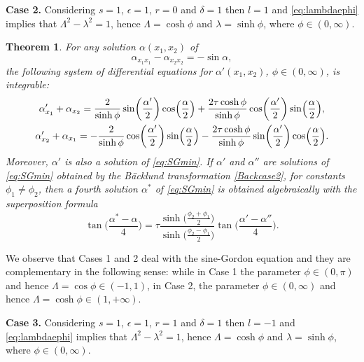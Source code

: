 \documentclass[pdftex]{sigma}
\numberwithin{equation}{section}
\newtheorem{Theorem}{Theorem}[section]
\begin{document}
{\bf Case 2.}
Considering $s=1$, $\epsilon=1$, $r=0$ and $\delta=1$ then $l=1$ and \eqref{eq:lambdaephi} implies that
$\Lambda^2 -\lambda^2=1$, hence $\Lambda=\cosh\phi$ and $\lambda=\sinh\phi$,
where $\phi\in (0,\infty)$.

\begin{Theorem}%
For any solution $\alpha(x_1,x_2)$ of
\begin{equation}\label{eq:SGmin}
\alpha_{x_1x_1}-\alpha_{x_2x_2}=-\sin \alpha,
\end{equation}
 the following system of differential equations for $\alpha'(x_1,x_2)$, $\phi\in(0,\infty)$, is integrable:
\begin{gather}
\alpha'_{x_1}+\alpha_{x_2}=\frac{2}{\sinh\phi}\sin\biggl(\frac{\alpha'}{2}\biggr)\cos\Bigl(\frac{\alpha}{2}\Bigr) +\frac{2\tau\cosh\phi}{\sinh\phi}\cos\biggl(\frac{\alpha'}{2}\biggr)\sin\Bigl(\frac{\alpha}{2}\Bigr),\nonumber\\
\alpha'_{x_2}+\alpha_{x_1}=-\frac{2}{\sinh\phi}\cos\biggl(\frac{\alpha'}{2}\biggr)\sin\Bigl(\frac{\alpha}{2}\Bigr) -\frac{2\tau\cosh\phi}{\sinh\phi}\sin\biggl(\frac{\alpha'}{2}\biggr)\cos\Bigl(\frac{\alpha}{2}\Bigr).\label{Backcase2}
\end{gather}
 Moreover, $\alpha'$ is also a solution of \eqref{eq:SGmin}.
If $\alpha'$ and $\alpha''$ are solutions of \eqref{eq:SGmin} obtained by the B\"acklund transformation \eqref{Backcase2}, for constants $\phi_1\neq \phi_2$, then a fourth solution $\alpha^*$ of \eqref{eq:SGmin} is obtained algebraically with the superposition formula
\begin{equation*}%
\tan \biggl(\frac{\alpha^*-\alpha}{4}\biggr) =
\tau \frac{\sinh\bigl(\frac{\phi_2+\phi_1}{2}\bigr) } {\sinh\bigl(\frac{\phi_2-\phi_1}{2}\bigr)}
\tan\biggl(\frac{\alpha'-\alpha''}{4}\biggr).
\end{equation*}
\end{Theorem}

We observe that Cases 1 and 2 deal with the sine-Gordon equation and they are complementary in the following sense: while in Case 1 the parameter $\phi\in(0,\pi)$ and hence
$\Lambda=\cos\phi\in (-1,1)$, in Case 2, the parameter $\phi\in (0,\infty)$ and hence $\Lambda=\cosh \phi \in (1,+\infty)$.


{\bf Case 3.}
Considering $s=1$, $\epsilon=1$, $r=1$ and $\delta=1$ then $l=-1$ and \eqref{eq:lambdaephi} implies that
$\Lambda^2 -\lambda^2=1$, hence $\Lambda=\cosh\phi$ and $\lambda=\sinh\phi$,
where $\phi\in (0,\infty)$.
\end{document}
